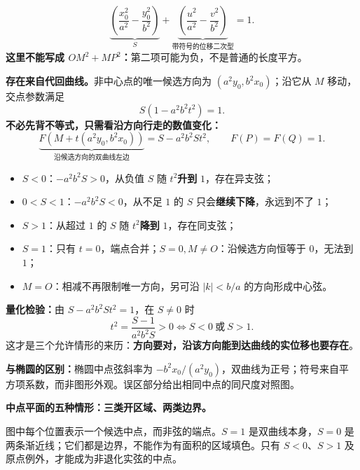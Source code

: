 \begin{explanationbox}
\[
\boxed{\underbrace{\left(\frac{x_0^2}{a^2}-\frac{y_0^2}{b^2}\right)}_{S}
+\underbrace{\left(\frac{u^2}{a^2}-\frac{v^2}{b^2}\right)}_{\text{带符号的位移二次型}}=1}.
\]
\textbf{这里不能写成 $OM^2+MP^2$：}第二项可能为负，不是普通的长度平方。
\par\medskip\noindent
\textbf{存在来自代回曲线。}非中心点的唯一候选方向为 $(a^2y_0,b^2x_0)$；沿它从 $M$ 移动，交点参数满足
\[
S(1-a^2b^2t^2)=1.
\]
\textbf{不必先背不等式，只需看沿方向行走的数值变化：}
\[
\underbrace{F(M+t(a^2y_0,b^2x_0))}_{\text{沿候选方向的双曲线左边}}
=S-a^2b^2St^2,\qquad F(P)=F(Q)=1.
\]
\begin{itemize}[leftmargin=2em,topsep=2pt,itemsep=2pt]
\item $S<0$：$-a^2b^2S>0$，从负值 $S$ 随 $t^2$\textbf{升到} $1$，存在异支弦；
\item $0<S<1$：$-a^2b^2S<0$，从不足 $1$ 的 $S$ 只会\textbf{继续下降}，永远到不了 $1$；
\item $S>1$：从超过 $1$ 的 $S$ 随 $t^2$\textbf{降到} $1$，存在同支弦；
\item $S=1$：只有 $t=0$，端点合并；$S=0,M\ne O$：沿候选方向恒等于 $0$，无法到 $1$；
\item $M=O$：相减不再限制唯一方向，另可沿 $|k|<b/a$ 的方向形成中心弦。
\end{itemize}
\textbf{量化检验：}由 $S-a^2b^2St^2=1$，在 $S\ne0$ 时
\[
\boxed{t^2=\frac{S-1}{a^2b^2S}>0
\iff S<0\ \text{或}\ S>1.}
\]
这才是三个允许情形的来历：\textbf{方向要对，沿该方向能到达曲线的实位移也要存在}。
\par\medskip
\textbf{与椭圆的区别：}椭圆中点弦斜率为 $-b^2x_0/(a^2y_0)$，双曲线为正号；符号来自平方项系数，而非图形外观。误区部分给出相同中点的同尺度对照图。
\end{explanationbox}

\clearpage
\begin{explanationbox}
\textbf{中点平面的五种情形：三类开区域、两类边界。}
\begin{center}\end{center}
图中每个位置表示一个候选中点，而非弦的端点。$S=1$ 是双曲线本身，$S=0$ 是两条渐近线；它们都是边界，不能作为有面积的区域填色。只有 $S<0$、$S>1$ 及原点例外，才能成为非退化实弦的中点。
\end{explanationbox}
